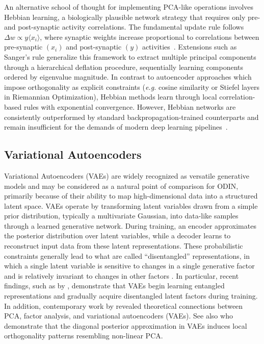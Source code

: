 \documentclass[twoside,11pt]{article}
\begin{document}
An alternative school of thought for implementing PCA-like operations involves Hebbian learning, a biologically plausible network strategy that requires only pre- and post-synaptic activity correlations. The fundamental update rule follows $\Delta w\propto y\langle x_i\rangle$, where synaptic weights increase proportional to correlations between pre-synaptic $(x_i)$ and post-synaptic $(y)$ activities~\cite{olshausen1998linear}. Extensions such as Sanger's rule generalize this framework to extract multiple principal components through a hierarchical deflation procedure, sequentially learning components ordered by eigenvalue magnitude. In contrast to autoencoder approaches which impose orthogonality as explicit constraints (\emph{e.g.} cosine similarity or Stiefel layers in Riemannian Optimization), Hebbian methods learn through local correlation-based rules with exponential convergence. However, Hebbian networks are consistently outperformed by standard backpropagation-trained counterparts and remain insufficient for the demands of modern deep learning pipelines~\cite{amato2019hebbian, miconi2021hebbian, kierkegaard2023comparison}.

\subsection*{Variational Autoencoders}
Variational Autoencoders (VAEs) are widely recognized as versatile generative models and may be considered as a natural point of comparison for ODIN, primarily because of their ability to map high-dimensional data into a structured latent space. VAEs operate by transforming latent variables drawn from a simple prior distribution, typically a multivariate Gaussian, into data-like samples through a learned generative network. During training, an encoder approximates the posterior distribution over latent variables, while a decoder learns to reconstruct input data from these latent representations. These probabilistic constraints generally lead to what are called ``disentangled'' representations, in which a single latent variable is sensitive to changes in a single generative factor and is relatively invariant to changes in other factors \cite{bengio2013representation}. In particular, recent findings, such as by \cite{ichikawa2024learning}, demonstrate that VAEs begin learning entangled representations and gradually acquire disentangled latent factors during training. In addition, contemporary work by \cite{ghojogh2021factor} revealed theoretical connections between PCA, factor analysis, and variational autoencoders (VAEs). See also \cite{rolinek2019variational} who demonstrate that the diagonal posterior approximation in VAEs induces local orthogonality patterns resembling non-linear PCA.
\end{document}
